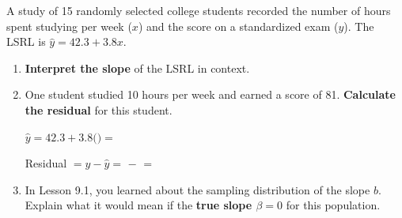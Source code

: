 \documentclass[10pt]{article}
\begin{document}
\namedateperiod

\vspace{0.15in}

A study of 15 randomly selected college students recorded the number of hours spent
studying per week ($x$) and the score on a standardized exam ($y$).
The LSRL is $\hat{y} = 42.3 + 3.8x$.

\begin{enumerate}

  \item \textbf{Interpret the slope} of the LSRL in context.


  \item One student studied 10 hours per week and earned a score of 81.
        \textbf{Calculate the residual} for this student.

        \vspace{0.05in}
        $\hat{y} = 42.3 + 3.8($$) = $ 

        \vspace{0.08in}
        Residual $= y - \hat{y} = $  $-$  $= $ 

        \vspace{0.1in}

  \item In Lesson 9.1, you learned about the sampling distribution of the slope $b$.
        Explain what it would mean if the \textbf{true slope $\beta = 0$} for this
        population.


\end{enumerate}
\end{document}
